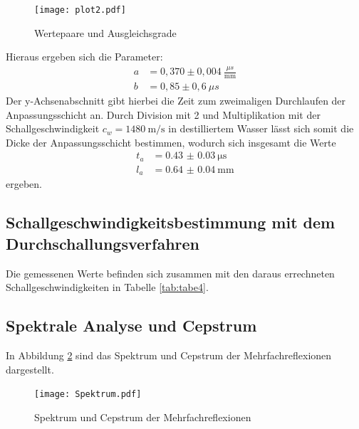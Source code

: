 \begin{figure}[H]
  \centering
  \texttt{[image: plot2.pdf]}
  \caption{Wertepaare und Ausgleichsgrade}
  \label{fig:plot2}
\end{figure}
Hieraus ergeben sich die Parameter:
\begin{align*}
  a &= 0,370 \pm 0,004 \: \frac{\mu s}{\text{mm}} \\
  b &= 0,85 \pm 0,6 \: \mu s
\end{align*}
Der y-Achsenabschnitt gibt hierbei die Zeit zum zweimaligen Durchlaufen der Anpassungsschicht
an. Durch Division mit 2 und Multiplikation mit der Schallgeschwindigkeit $c_w = \SI{1480}{\meter\per\second}$
in destilliertem Wasser lässt sich somit die Dicke der Anpassungsschicht bestimmen,
wodurch sich insgesamt die Werte
\begin{align*}
  t_a &= \SI{0.43(3)}{\micro\second} \\
  l_a &= \SI{0.64(4)}{\milli\meter}
\end{align*}
ergeben.


\subsection{Schallgeschwindigkeitsbestimmung mit dem Durchschallungsverfahren}
Die gemessenen Werte befinden sich zusammen mit den daraus errechneten Schallgeschwindigkeiten
in Tabelle \ref{tab:tabe4}.


\subsection{Spektrale Analyse und Cepstrum}
In Abbildung \ref{fig:cep} sind das Spektrum und Cepstrum der Mehrfachreflexionen
dargestellt.
\begin{figure}[H]
  \centering
  \texttt{[image: Spektrum.pdf]}
  \caption{Spektrum und Cepstrum der Mehrfachreflexionen}
  \label{fig:cep}
\end{figure}

